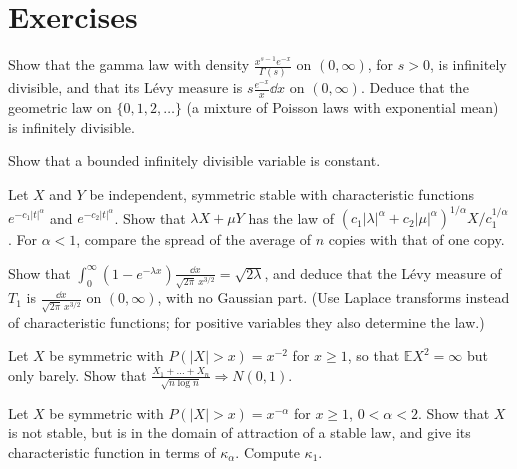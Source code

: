 \section{Exercises}

\begin{exercise}[$\star$]\label{ex:idexamples}
Show that the gamma law with density $\frac{x^{s-1}e^{-x}}{\Gamma(s)}$ on $(0,\infty)$, for $s>0$, is infinitely divisible, and that its L\'evy measure is $s\frac{e^{-x}}x\dd x$ on $(0,\infty)$.
Deduce that the geometric law on $\{0,1,2,\dots\}$ (a mixture of Poisson laws with exponential mean) is infinitely divisible.
\end{exercise}

\begin{exercise}[$\star$]\label{ex:bounded}
Show that a bounded infinitely divisible variable is constant.
\end{exercise}

\begin{exercise}[$\star$]\label{ex:stablesum}
Let $X$ and $Y$ be independent, symmetric stable with characteristic functions $e^{-c_1|t|^\alpha}$ and $e^{-c_2|t|^\alpha}$. Show that $\lambda X+\mu Y$
has the law of $(c_1|\lambda|^\alpha+c_2|\mu|^\alpha)^{1/\alpha}X/c_1^{1/\alpha}$. For $\alpha<1$, compare the spread of the average of $n$ copies with that of one copy.
\end{exercise}

\begin{exercise}[$\star\star$]\label{ex:levymeasure}
Show that $\int_0^\infty(1-e^{-\lambda x})\frac{\dd x}{\sqrt{2\pi}\,x^{3/2}}=\sqrt{2\lambda}$, and deduce that the L\'evy measure of $T_1$ is $\frac{\dd x}{\sqrt{2\pi}\,x^{3/2}}$ on
$(0,\infty)$, with no Gaussian part. (Use Laplace transforms instead of characteristic functions; for positive variables they also determine the law.)
\end{exercise}

\begin{exercise}[$\star\star$]\label{ex:boundary}
Let $X$ be symmetric with $P(|X|>x)=x^{-2}$ for $x\ge1$, so that $\mathbb EX^2=\infty$ but only barely. Show that $\frac{X_1+\dots+X_n}{\sqrt{n\log n}}\Rightarrow N(0,1)$.
\end{exercise}

\begin{exercise}[$\star\star$]\label{ex:paretodomain}
Let $X$ be symmetric with $P(|X|>x)=x^{-\alpha}$ for $x\ge1$, $0<\alpha<2$. Show that $X$ is not stable, but is in the domain of attraction of a stable law,
and give its characteristic function in terms of $\kappa_\alpha$. Compute $\kappa_1$.
\end{exercise}

